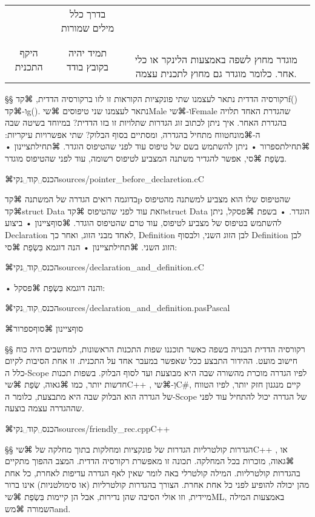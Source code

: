 {\begin{center}
\begin{tabular}{c c c}
& 
בדרך כלל מילים שמורות
		\\
היקף התכנית
& 
תמיד יהיה בקובץ בודד
& 
\pbox{6cm}{
\leavevmode
\newline
 מוגדר מחוץ לשפה באמצעות הלינקר או כלי אחר.
 כלומר מוגדר גם מחוץ לתכנית עצמה.
\newline
}
		\\

\bottomrule
\end{tabular}
\end{center}
§§ רקורסיה הדדית
נתאר לעצמנו שתי פונקציות הקוראות זו לזו ברקורסיה הדדית, ⌘קד{f()}  ו-⌘קד{g()}. נתאר לעצמנו שני טיפוסים ⌘שי{Male} ו-⌘שי{Female} שהגדרת האחד תלויה בהגדרת האחר. 
איך ניתן לכתוב זוג הגדרות שתלויות זו בזו הדדית? במיוחד בשיטה שבה ה-⌘מונח{טווח} מתחיל בהגדרה, ומסתיים בסוף הבלוק?
שתי אפשרויות עיקריות:
⌘תחילת{ספרור}
• ניתן להשתמש בשם של טיפוס עוד לפני שהטיפוס הוגדר. 
⌘תחילת{ציינון}
• בִּשְׂפַת ⌘סי, אפשר להגדיר משתנה המצביע לטיפוס רשומה, עוד לפני שהטיפוס מוגדר.

⌘הכנס␣קוד␣נקי{sources/pointer_before_declaretion.c}{C}

 בדוגמה רואים הגדרה של המשתנה ⌘קד{p} שהטיפוס שלו הוא מצביע למשתנה  מהטיפוס ⌘קד{struct Data} וזאת עוד לפני שהטיפוס  ⌘קד{struct Data} הוגדר. 
• בשפת ⌘פסקל, ניתן להשתמש בטיפוס של מצביע לטיפוס, עוד טרם שהטיפוס הוגדר. 
⌘סוף{ציינון}
• ביצוע Declaration לאחד מבני הזוג, ואחר כך, Definition לבן הזוג השני, ולבסוף Definition לבן הזוג השני. 
⌘תחילת{ציינון}
• הנה דוגמא בִּשְׂפַת ⌘סי:

⌘הכנס␣קוד␣נקי{sources/declaration_and_definition.c}{C}

• והנה דוגמא בִּשְׂפַת ⌘פסקל:

⌘הכנס␣קוד␣נקי{sources/declaration_and_definition.pas}{Pascal}

⌘סוף{ציינון}
⌘סוף{ספרור}

§§ רקורסיה הדדית הבנויה בשפה
כאשר תוכננו שפות התכנות הראשונות, למחשבים היה כוח חישוב מועט. ההידור התבצע ככל שאפשר במעבר אחד על התכנית. זו אחת הסיבות לקיום כלל ה-Scope לפיו הגדרה מוכרת מהשורה שבה היא מבוצעת ועד לסוף הבלוק. בשפות תכנות חדשות יותר, כמו ⌘גאוה, שְׂפַת ⌘שי{C++} , וְ-⌘שי{C\#}, קיים מנגנון חזק יותר, לפיו הטווח של הגדרה הוא הבלוק שבה היא מתבצעת, כלומר ה-Scope של הגדרה יכול להתחיל עוד לפני שההגדרה עצמה בוצעה.



⌘הכנס␣קוד␣נקי{sources/friendly_rec.cpp}{C++}

§§ הגדרות קולטרליות
הגדרות של פונקציות ומחלקות בתוך מחלקה של ⌘שי{C++} , או ⌘גאוה, מוכרות בכל המחלקה. תכונה זו מאפשרת רקורסיה הדדית. המצב ההפוך מתקיים בהגדרות קולטרליות. המילה קולטרלי באה לומר שאין לאף הגדרה עדיפות לאחרת, כל אחת מהן יכולה להופיע לפני כל אחת אחרת. הצורך בהגדרות קולטרליות (או סימולטניות) אינו ברור מיידית, וזו אולי הסיבה שהן נדירות, אבל הן קיימות בִּשְׂפַת ⌘שי{ML}, באמצעות המילה השמורה ⌘מש{and}.

}
